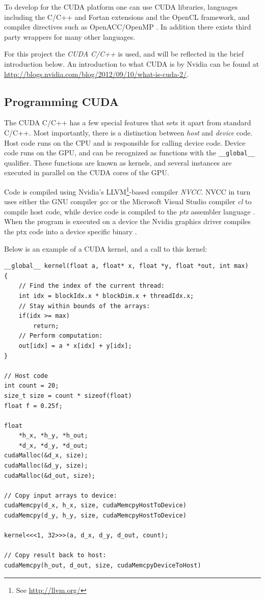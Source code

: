 To develop for the CUDA platform one can use CUDA libraries, languages including the C/C++ and Fortan extensions and the
OpenCL framework, and compiler directives such as OpenACC/OpenMP \cite{nvidiaopenmp}.
In addition there exists third party wrappers for many other languages.

For this project the \emph{CUDA C/C++} is used, and will be reflected in the brief introduction below.
An introduction to what CUDA is by Nvidia can be found at \url{http://blogs.nvidia.com/blog/2012/09/10/what-is-cuda-2/}.
\subsection{Programming CUDA}
The CUDA C/C++ has a few special features that sets it apart from standard C/C++. Most importantly, there is a
distinction between \emph{host} and \emph{device} code. Host code runs on the CPU and is responsible for calling device code. Device
code runs on the GPU, and can be recognized as functions with the \lstinline{__global__} qualifier. These functions are
known as kernels, and several instances are executed in parallel on the CUDA cores of the GPU.

Code is compiled using Nvidia's LLVM\footnote{See \url{http://llvm.org/}}-based compiler \emph{NVCC}. NVCC in turn uses
either the GNU compiler \emph{gcc} or the Microsoft Visual Studio compiler \emph{cl} to compile host code, while device
code is compiled to the \emph{ptx} assembler language \cite{nvcc}.
When the program is executed on a device the Nvidia graphics driver compiles the ptx code into a device specific binary \cite{nvptx}.

Below is an example of a CUDA kernel, and a call to this kernel:
\begin{lstlisting}
__global__ kernel(float a, float* x, float *y, float *out, int max)
{
	// Find the index of the current thread:
	int idx = blockIdx.x * blockDim.x + threadIdx.x;
	// Stay within bounds of the arrays:
	if(idx >= max)
		return;	
	// Perform computation:
	out[idx] = a * x[idx] + y[idx];
}

// Host code
int count = 20;
size_t size = count * sizeof(float)
float f = 0.25f;

float 
	*h_x, *h_y, *h_out;
	*d_x, *d_y, *d_out;
cudaMalloc(&d_x, size);
cudaMalloc(&d_y, size);
cudaMalloc(&d_out, size);

// Copy input arrays to device:
cudaMemcpy(d_x, h_x, size, cudaMemcpyHostToDevice)
cudaMemcpy(d_y, h_y, size, cudaMemcpyHostToDevice)

kernel<<<1, 32>>>(a, d_x, d_y, d_out, count);

// Copy result back to host:
cudaMemcpy(h_out, d_out, size, cudaMemcpyDeviceToHost)
\end{lstlisting}

